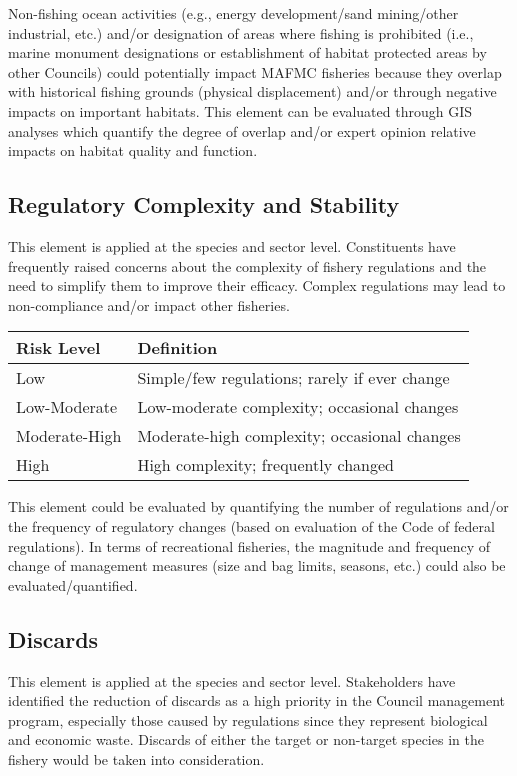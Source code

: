 \documentclass[11pt,]{article}
\begin{document}
Non-fishing ocean activities (e.g., energy development/sand mining/other
industrial, etc.) and/or designation of areas where fishing is
prohibited (i.e., marine monument designations or establishment of
habitat protected areas by other Councils) could potentially impact
MAFMC fisheries because they overlap with historical fishing grounds
(physical displacement) and/or through negative impacts on important
habitats. This element can be evaluated through GIS analyses which
quantify the degree of overlap and/or expert opinion relative impacts on
habitat quality and function.

\subsection{Regulatory Complexity and
Stability}\label{regulatory-complexity-and-stability}

This element is applied at the species and sector level. Constituents
have frequently raised concerns about the complexity of fishery
regulations and the need to simplify them to improve their efficacy.
Complex regulations may lead to non-compliance and/or impact other
fisheries.

\begin{longtable}[]{@{}ll@{}}
\toprule
Risk Level & Definition\tabularnewline
\midrule
\endhead
Low & Simple/few regulations; rarely if ever change\tabularnewline
Low-Moderate & Low-moderate complexity; occasional
changes\tabularnewline
Moderate-High & Moderate-high complexity; occasional
changes\tabularnewline
High & High complexity; frequently changed\tabularnewline
\bottomrule
\end{longtable}

This element could be evaluated by quantifying the number of regulations
and/or the frequency of regulatory changes (based on evaluation of the
Code of federal regulations). In terms of recreational fisheries, the
magnitude and frequency of change of management measures (size and bag
limits, seasons, etc.) could also be evaluated/quantified.

\subsection{Discards}\label{discards}

This element is applied at the species and sector level. Stakeholders
have identified the reduction of discards as a high priority in the
Council management program, especially those caused by regulations since
they represent biological and economic waste. Discards of either the
target or non-target species in the fishery would be taken into
consideration.
\end{document}
